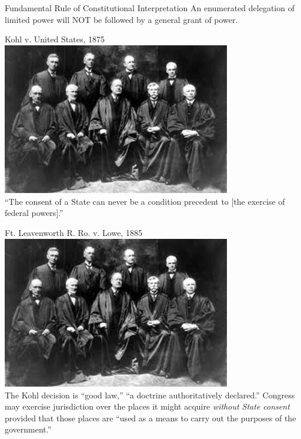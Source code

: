 \begin{frame}
    \begin{varblock}[.9\textwidth]{Fundamental Rule of Constitutional Interpretation}
        An enumerated delegation of limited power will NOT be followed by a general grant of power.
    \end{varblock}
\end{frame}

\begin{frame}{Kohl v. United States, 1875}
    \centering
    \includegraphics[width=0.75\textwidth]{img/sc-1905.png} \\
    { \large ``The consent of a State can never be a condition precedent to [the exercise of federal powers].'' }
\end{frame}

\begin{frame}{Ft. Leavenworth R. Ro. v. Lowe, 1885}
    \centering
    \includegraphics[width=0.75\textwidth]{img/sc-1905.png} \\
    The Kohl decision is ``good law,'' ``a doctrine authoritatively declared.'' Congress may exercise jurisdiction over the places it might acquire \emph{without State consent} provided that those places are ``used as a means to carry out the purposes of the government.''
\end{frame}


